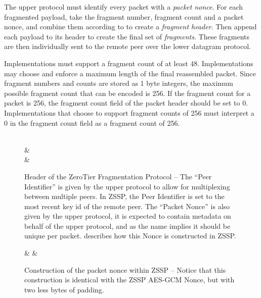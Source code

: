 \documentclass{article}
\begin{document}
The upper protocol must identify every packet with a \emph{packet nonce}. For each fragmented payload, take the fragment number, fragment count and a packet nonce, and combine them according to  to create a \emph{fragment header}. Then append each payload to its header to create the final set of \emph{fragments}. These fragments are then individually sent to the remote peer over the lower datagram protocol.

Implementations must support a fragment count of at least 48. Implementations may choose and enforce a maximum length of the final reassembled packet. Since fragment numbers and counts are stored as 1 byte integers, the maximum possible fragment count that can be encoded is 256. If the fragment count for a packet is 256, the fragment count field of the packet header should be set to 0. Implementations that choose to support fragment counts of 256 must interpret a 0 in the fragment count field as a fragment count of 256.

\begin{figure}
	\caption{Header of the ZeroTier Fragmentation Protocol -- The ``Peer Identifier'' is given by the upper protocol to allow for multiplexing between multiple peers. In ZSSP, the Peer Identifier is set to the most recent key id of the remote peer. The ``Packet Nonce'' is also given by the upper protocol, it is expected to contain metadata on behalf of the upper protocol, and as the name implies it should be unique per packet.  describes how this Nonce is constructed in ZSSP.}\label{packet:header}
	\centering
	\begin{bytefield}[bitwidth=6.5em]{4}
		 \\
		 &  \\
		& 
	\end{bytefield}
\end{figure}

\begin{figure}
	\caption{Construction of the packet nonce within ZSSP -- Notice that this construction is identical with the ZSSP AES-GCM Nonce, but with two less bytes of padding.}\label{fig:header_nonce}
	\centering
	\begin{bytefield}[bitwidth=3.5em]{9}
		 & 
		& 
	\end{bytefield}
\end{figure}
\end{document}

